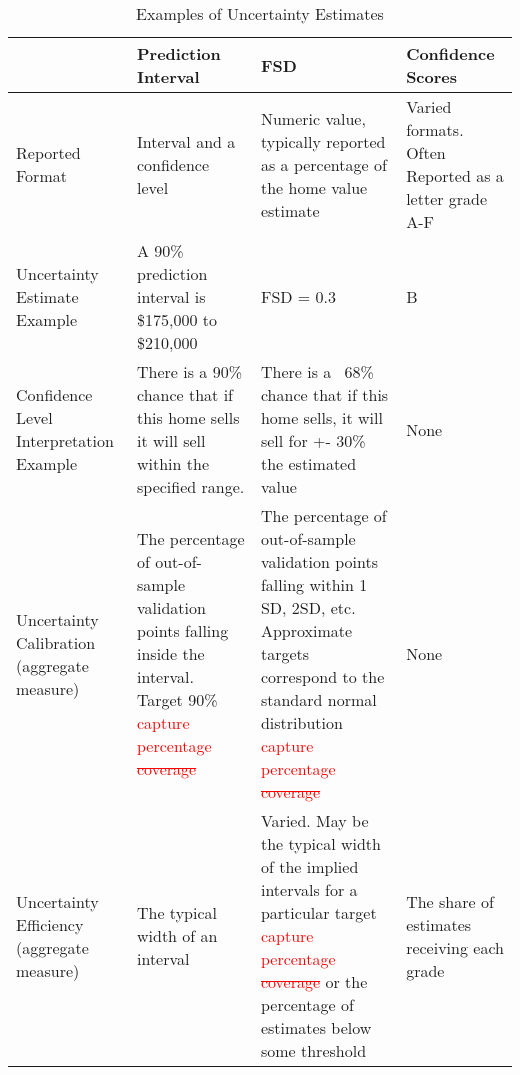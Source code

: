 \documentclass[colTwo]{anon}
\theoremstyle{definition}
\begin{document}
\begin{table*}[h!]
\centering
\begin{tabular}{|p{2.8cm} | p{3.6cm} | p{3.6cm} | p{3.6cm} |} 
 \hline
  & \textbf{Prediction Interval} & \textbf{FSD} & \textbf{Confidence Scores} \\ [0.5ex] 
 \hline\hline
 Reported Format & Interval and a confidence level & Numeric value, typically reported as a percentage of the home value estimate & Varied formats. Often Reported as a letter grade A-F \\ \hline
 Uncertainty Estimate Example & A 90\% prediction interval is \$175,000 to \$210,000 & FSD = 0.3 & B \\
 \hline
Confidence Level Interpretation Example & There is a 90\% chance that if this home sells it will sell within the specified range. & There is a ~68\% chance that if this home sells, it will sell for +- 30\% the estimated value & None \\
\hline
Uncertainty Calibration
(aggregate measure) & The percentage of out-of-sample validation points falling inside the interval. Target 90\% \textcolor{red}{capture percentage \st{coverage}} & The percentage of out-of-sample validation points falling within 1 SD, 2SD, etc. Approximate targets correspond to the standard normal distribution \textcolor{red}{capture percentage \st{coverage}} & None \\
\hline
 Uncertainty Efficiency
(aggregate measure)
 & The typical width of an interval & Varied. May be the typical width of the implied intervals for a particular target \textcolor{red}{capture percentage \st{coverage}} or the percentage of estimates below some threshold & The share of estimates receiving each grade \\ [1ex] 
 \hline
\end{tabular}
\caption{Examples of Uncertainty Estimates}
\label{table:1}
\end{table*}
\end{document}
